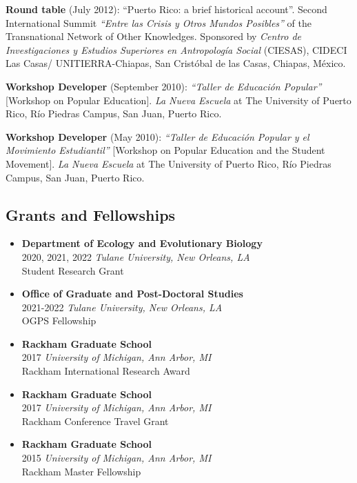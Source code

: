 \documentclass[
  letterpaper,
  DIV=11,
  numbers=noendperiod]{scrartcl}
\begin{document}
\textbf{Round table} (July 2012): ``Puerto Rico: a brief historical
account''. Second International Summit \emph{``Entre las Crisis y Otros
Mundos Posibles''} of the Transnational Network of Other Knowledges.
Sponsored by \emph{Centro de Investigaciones y Estudios Superiores en
Antropología Social} (CIESAS), CIDECI Las Casas/ UNITIERRA-Chiapas, San
Cristóbal de las Casas, Chiapas, México.

\textbf{Workshop Developer} (September 2010): \emph{``Taller de
Educación Popular''} {[}Workshop on Popular Education{]}. \emph{La Nueva
Escuela} at The University of Puerto Rico, Río Piedras Campus, San Juan,
Puerto Rico.

\textbf{Workshop Developer} (May 2010): \emph{``Taller de Educación
Popular y el Movimiento Estudiantil''} {[}Workshop on Popular Education
and the Student Movement{]}. \emph{La Nueva Escuela} at The University
of Puerto Rico, Río Piedras Campus, San Juan, Puerto Rico.

\subsection{\texorpdfstring{ Grants and
Fellowships}{ Grants and Fellowships}}\label{grants-and-fellowships}

\begin{itemize}
\item
  \textbf{Department of Ecology and Evolutionary Biology}\\
  {2020, 2021, 2022} \emph{Tulane University, New Orleans, LA}\\
  Student Research Grant
\item
  \textbf{Office of Graduate and Post-Doctoral Studies}\\
  {2021-2022} \emph{Tulane University, New Orleans, LA}\\
  OGPS Fellowship
\item
  \textbf{Rackham Graduate School}\\
  {2017} \emph{University of Michigan, Ann Arbor, MI}\\
  Rackham International Research Award
\item
  \textbf{Rackham Graduate School}\\
  {2017} \emph{University of Michigan, Ann Arbor, MI}\\
  Rackham Conference Travel Grant
\item
  \textbf{Rackham Graduate School}\\
  {2015} \emph{University of Michigan, Ann Arbor, MI}\\
  Rackham Master Fellowship
\end{itemize}
\end{document}
